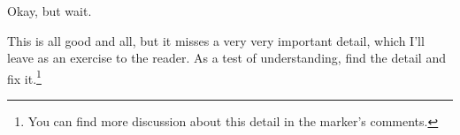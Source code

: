 \documentclass[10pt]{article}
\begin{document}
	Okay, but wait.

	This is all good and all, but it misses a very very important detail, which I'll leave as an exercise to the reader. As a test of understanding, find the detail and fix it.\footnote{You can find more discussion about this detail in the marker's comments.}
	
	
	
	
	
	
	
	
	
	
	
	
	
	
	
	
	
	
	
	
	
	
	
	
	
\end{document}
